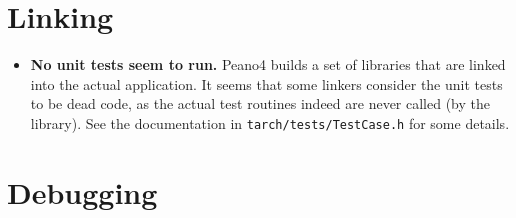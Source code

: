 \section{Linking}

\begin{itemize}
  \item \textbf{No unit tests seem to run.} Peano4 builds a set of libraries that are linked into 
    the actual application. It seems that some linkers consider the unit tests to be dead code,
    as the actual test routines indeed are never called (by the library). See the documentation in 
    \texttt{tarch/tests/TestCase.h} for some details. 
\end{itemize}




\section{Debugging}
